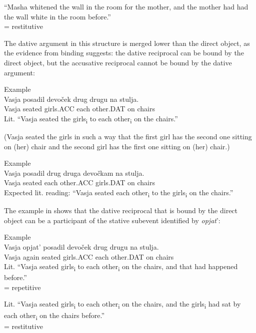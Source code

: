 \documentclass[output=paper,modfonts,nonflat,
 hidelinks
]{langsci/langscibook}
\begin{document}
\ex “Masha whitened the wall in the room for the mother, and the   mother had had the wall white in the room before.”\\
= {restitutive}
\z
\z


The dative argument in this structure is merged lower than the direct object, as the evidence from binding suggests: the dative reciprocal can be bound by the direct object, but the accusative reciprocal cannot be bound by the dative argument:


 \ea\label{ex:bondarenko:}
{Example}\\

\gll Vasja posadil devoček drug drugu na stulja.\\
     Vasja seated girls.ACC each other.DAT on chairs\\
\glt Lit. “Vasja seated the girls\textsubscript{i} to each other\textsubscript{i} on the chairs.”


(Vasja seated the girls in such a way that the first girl has the second one sitting on (her) chair and the second girl has the first one sitting on (her) chair.)
\z

 \ea\label{ex:bondarenko:}
{Example}\\

\gll *Vasja posadil drug druga devočkam na stulja.\\
     Vasja seated each other.ACC girls.DAT on chairs\\
\glt Expected lit. reading: “Vasja seated each other\textsubscript{i} to the girls\textsubscript{i} on the chairs.”
\z


The example in  shows that the dative reciprocal that is bound by the direct object can be a participant of the stative subevent identified by \textit{opjat}’:


 \ea\label{ex:bondarenko:}
{Example}\\

\gll Vasja opjat’ posadil devoček drug drugu na stulja.\\
     Vasja again seated girls.ACC each other.DAT on chairs\\
\ea Lit. “Vasja seated girls\textsubscript{i} to each other\textsubscript{i} on the chairs, and that   had happened before.”\\
= {repetitive}

\ex Lit. “Vasja seated girls\textsubscript{i} to each other\textsubscript{i} on the chairs, and the   girls\textsubscript{i} had sat by each other\textsubscript{i} on the chairs before.”\\
= {restitutive}
\z
\z
\end{document}
